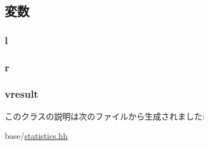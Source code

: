 \subsection{変数}
\hypertarget{classStats_1_1BinaryNode_a6ad7f056f60bd5cfec2caa5d5f4e363f}{
\subsubsection[{l}]{ {\bf l}}}
\label{classStats_1_1BinaryNode_a6ad7f056f60bd5cfec2caa5d5f4e363f}
\hypertarget{classStats_1_1BinaryNode_aa3722e7d196563badabbb861eda68230}{
\subsubsection[{r}]{ {\bf r}}}
\label{classStats_1_1BinaryNode_aa3722e7d196563badabbb861eda68230}
\hypertarget{classStats_1_1BinaryNode_a8f41af856442757ec68f3391333d3eb2}{
\subsubsection[{vresult}]{ {\bf vresult}}}
\label{classStats_1_1BinaryNode_a8f41af856442757ec68f3391333d3eb2}


このクラスの説明は次のファイルから生成されました:\begin{DoxyCompactItemize}
\item 
base/\hyperlink{statistics_8hh}{statistics.hh}\end{DoxyCompactItemize}
